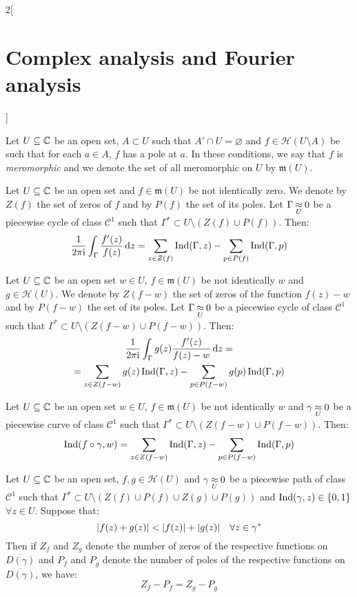 \documentclass[../../../main.tex]{subfiles}
\begin{document}
\begin{multicols}{2}[\section{Complex analysis and Fourier analysis}]
\begin{theorem}
  \end{theorem}
  \begin{definition}
    Let $U\subseteq \mathbb{C}$ be an open set, $A\subset U$ such that $A'\cap U=\varnothing$ and $f\in\mathcal{H}(U\setminus A)$ be such that for each $a\in A$, $f$ has a pole at $a$. In these conditions, we say that $f$ is \emph{meromorphic} and we denote the set of all meromorphic on $U$ by $\mathfrak{m}(U)$.
  \end{definition}
  \begin{theorem}
    Let $U\subseteq \mathbb{C}$ be an open set and $f\in\mathfrak{m}(U)$ be not identically zero. We denote by $Z(f)$ the set of zeros of $f$ and by $P(f)$ the set of its poles. Let $\Gamma\mathbin{\underset{U}{\approx}} 0$ be a piecewise cycle of class $\mathcal{C}^1$ such that $\Gamma^*\subset U\setminus (Z(f)\cup P(f))$. Then:
    $$\frac{1}{2\pi\mathrm{i}}\int_{\Gamma}\frac{f'(z)}{f(z)}\dd{z}=\sum_{z\in Z(f)}\operatorname{Ind}(\Gamma,z)-\sum_{p\in P(f)}\operatorname{Ind}(\Gamma,p)$$
  \end{theorem}
  \begin{theorem}
    Let $U\subseteq \mathbb{C}$ be an open set $w\in U$, $f\in\mathfrak{m}(U)$ be not identically $w$ and $g\in\mathcal{H}(U)$. We denote by $Z(f-w)$ the set of zeros of the function $f(z)-w$ and by $P(f-w)$ the set of its poles. Let $\Gamma\mathbin{\underset{U}{\approx}} 0$ be a piecewise cycle of class $\mathcal{C}^1$ such that $\Gamma^*\subset U\setminus (Z(f-w)\cup P(f-w))$. Then:
    \begin{multline*}
      \frac{1}{2\pi\mathrm{i}}\int_{\Gamma}g(z)\frac{f'(z)}{f(z)-w}\dd{z}=\\=\sum_{z\in Z(f-w)}g(z)\operatorname{Ind}(\Gamma,z)-\sum_{p\in P(f-w)}g(p)\operatorname{Ind}(\Gamma,p)
    \end{multline*}
  \end{theorem}
  \begin{corollary}
    Let $U\subseteq \mathbb{C}$ be an open set $w\in U$, $f\in\mathfrak{m}(U)$ be not identically $w$ and $\gamma\mathbin{\underset{U}{\approx}} 0$ be a piecewise curve of class $\mathcal{C}^1$ such that $\Gamma^*\subset U\setminus (Z(f-w)\cup P(f-w))$. Then:
    \begin{equation*}
      \operatorname{Ind}(f\circ\gamma,w)=\sum_{z\in Z(f-w)}\operatorname{Ind}(\Gamma,z)-\sum_{p\in P(f-w)}\operatorname{Ind}(\Gamma,p)
    \end{equation*}
  \end{corollary}
  \begin{theorem}
    Let $U\subseteq \mathbb{C}$ be an open set, $f,g\in\mathcal{H}(U)$ and $\gamma\mathbin{\underset{U}{\approx}} 0$ be a piecewise path of class $\mathcal{C}^1$ such that $\Gamma^*\subset U\setminus (Z(f)\cup P(f)\cup Z(g)\cup P(g))$ and $\operatorname{Ind}(\gamma,z)\in\{0,1\}$ $\forall z\in U$. Suppose that: $$\abs{f(z)+g(z)}<\abs{f(z)}+\abs{g(z)}\quad\forall z\in \gamma^*$$ Then if $Z_f$ and $Z_g$ denote the number of zeros of the respective functions on $\overline{D(\gamma)}$ and $P_f$ and $P_g$ denote the number of poles of the respective functions on $\overline{D(\gamma)}$, we have: $$Z_f-P_f=Z_g-P_g$$

\end{theorem}
\end{multicols}
\end{document}
